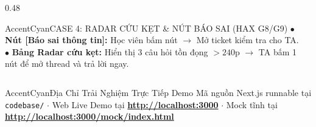 \documentclass[aspectratio=169,10pt]{beamer}
\begin{document}
\begin{frame}
\begin{columns}[T]
\begin{column}{0.48\textwidth}
      \vspace{0.15cm}
      \begin{chatbubble}{AccentCyan}{CASE 4: RADAR CỨU KẸT \& NÚT BÁO SAI (HAX G8/G9)}
        \tiny
        $\bullet$ \textbf{Nút [Báo sai thông tin]:} Học viên bấm nút $\rightarrow$ Mở ticket kiểm tra cho TA.\\[0.05cm]
        $\bullet$ \textbf{Bảng Radar cứu kẹt:} Hiển thị $3$ câu hỏi tồn đọng $> 240\text{p}$ $\rightarrow$ TA bấm 1 nút để mở thread và trả lời ngay.
      \end{chatbubble}
    \end{column}
  \end{columns}

  \vspace{0.15cm}
  \begin{calloutbox}{AccentCyan}{Địa Chỉ Trải Nghiệm Trực Tiếp Demo}
    \tiny\centering
    Mã nguồn Next.js runnable tại \texttt{codebase/} $\cdot$ Web Live Demo tại \textbf{\url{http://localhost:3000}} $\cdot$ Mock tĩnh tại \textbf{\url{http://localhost:3000/mock/index.html}}
  \end{calloutbox}
\end{frame}
\end{document}
